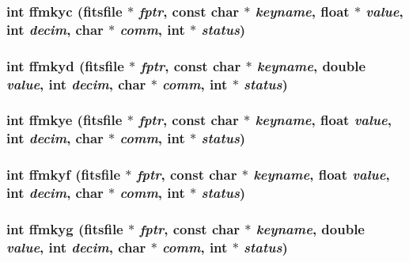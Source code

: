 \subsubsection{\setlength{\rightskip}{0pt plus 5cm}int ffmkyc (\bf{fitsfile} $\ast$ {\em fptr}, const char $\ast$ {\em keyname}, float $\ast$ {\em value}, int {\em decim}, char $\ast$ {\em comm}, int $\ast$ {\em status})}\label{src_2fitsio_8h_7e6d14931514dc9721cfc11506d550cf}


\subsubsection{\setlength{\rightskip}{0pt plus 5cm}int ffmkyd (\bf{fitsfile} $\ast$ {\em fptr}, const char $\ast$ {\em keyname}, double {\em value}, int {\em decim}, char $\ast$ {\em comm}, int $\ast$ {\em status})}\label{src_2fitsio_8h_2f427b6b25fee401214df98e56ebc429}


\subsubsection{\setlength{\rightskip}{0pt plus 5cm}int ffmkye (\bf{fitsfile} $\ast$ {\em fptr}, const char $\ast$ {\em keyname}, float {\em value}, int {\em decim}, char $\ast$ {\em comm}, int $\ast$ {\em status})}\label{src_2fitsio_8h_84fa2097111d3805d61b197d7a00ee78}


\subsubsection{\setlength{\rightskip}{0pt plus 5cm}int ffmkyf (\bf{fitsfile} $\ast$ {\em fptr}, const char $\ast$ {\em keyname}, float {\em value}, int {\em decim}, char $\ast$ {\em comm}, int $\ast$ {\em status})}\label{src_2fitsio_8h_a6e96904c21b62c82a78f38a345e7b39}


\subsubsection{\setlength{\rightskip}{0pt plus 5cm}int ffmkyg (\bf{fitsfile} $\ast$ {\em fptr}, const char $\ast$ {\em keyname}, double {\em value}, int {\em decim}, char $\ast$ {\em comm}, int $\ast$ {\em status})}\label{src_2fitsio_8h_cfca16506886068b451f7a977934509b}


